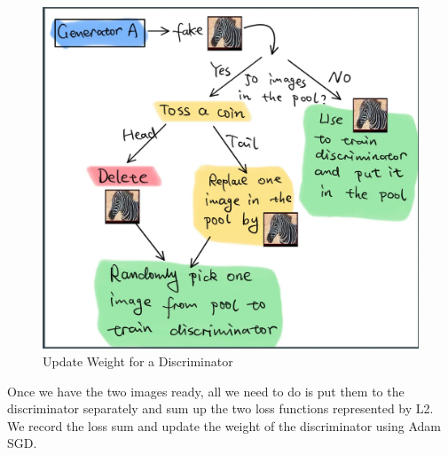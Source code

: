 \documentclass[
]{article}
\begin{document}
\begin{figure}
\centering
\includegraphics{./assets/Update_Weight_for_a_Discriminator.png}
\caption{Update Weight for a Discriminator}
\end{figure}

Once we have the two images ready, all we need to do is put them to the
discriminator separately and sum up the two loss functions represented
by L2. We record the loss sum and update the weight of the discriminator
using Adam SGD.
\end{document}
